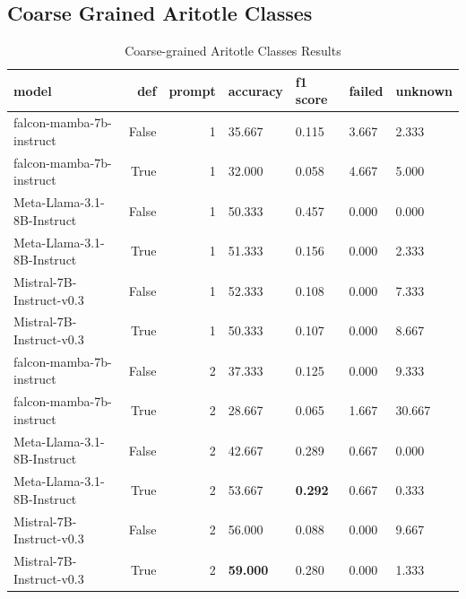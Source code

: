 \subsection{ Coarse Grained Aritotle Classes}
\begin{table}[H]
\centering
\caption{Coarse-grained Aritotle Classes Results}
\begin{tabular}{lrrllll}
\toprule
model & def & prompt & accuracy & f1 score & failed & unknown \\
\midrule
falcon-mamba-7b-instruct & False & 1 & 35.667 & 0.115 & 3.667 & 2.333 \\
falcon-mamba-7b-instruct & True & 1 & 32.000 & 0.058 & 4.667 & 5.000 \\
Meta-Llama-3.1-8B-Instruct & False & 1 & 50.333 & 0.457 & 0.000 & 0.000 \\
Meta-Llama-3.1-8B-Instruct & True & 1 & 51.333 & 0.156 & 0.000 & 2.333 \\
Mistral-7B-Instruct-v0.3 & False & 1 & 52.333 & 0.108 & 0.000 & 7.333 \\
Mistral-7B-Instruct-v0.3 & True & 1 & 50.333 & 0.107 & 0.000 & 8.667 \\
falcon-mamba-7b-instruct & False & 2 & 37.333 & 0.125 & 0.000 & 9.333 \\
falcon-mamba-7b-instruct & True & 2 & 28.667 & 0.065 & 1.667 & 30.667 \\
Meta-Llama-3.1-8B-Instruct & False & 2 & 42.667 & 0.289 & 0.667 & 0.000 \\
Meta-Llama-3.1-8B-Instruct & True & 2 & 53.667 & \textbf{0.292} & 0.667 & 0.333 \\
Mistral-7B-Instruct-v0.3 & False & 2 & 56.000 & 0.088 & 0.000 & 9.667 \\
Mistral-7B-Instruct-v0.3 & True & 2 & \textbf{59.000} & 0.280 & 0.000 & 1.333 \\
\bottomrule
\end{tabular}
\end{table}


